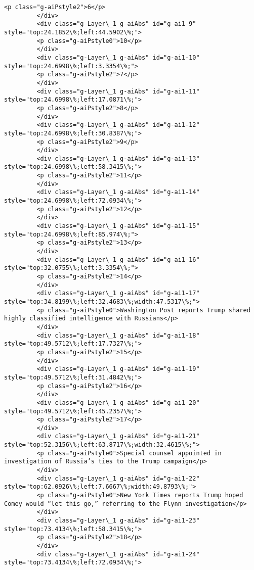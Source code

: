 \documentclass[11pt]{article}
\begin{document}
\begin{Verbatim}[commandchars=\\\{\}]
         <p class="g-aiPstyle2">6</p>
         </div>
         <div class="g-Layer\_1 g-aiAbs" id="g-ai1-9" style="top:24.1852\%;left:44.5902\%;">
         <p class="g-aiPstyle0">10</p>
         </div>
         <div class="g-Layer\_1 g-aiAbs" id="g-ai1-10" style="top:24.6998\%;left:3.3354\%;">
         <p class="g-aiPstyle2">7</p>
         </div>
         <div class="g-Layer\_1 g-aiAbs" id="g-ai1-11" style="top:24.6998\%;left:17.0871\%;">
         <p class="g-aiPstyle2">8</p>
         </div>
         <div class="g-Layer\_1 g-aiAbs" id="g-ai1-12" style="top:24.6998\%;left:30.8387\%;">
         <p class="g-aiPstyle2">9</p>
         </div>
         <div class="g-Layer\_1 g-aiAbs" id="g-ai1-13" style="top:24.6998\%;left:58.3415\%;">
         <p class="g-aiPstyle2">11</p>
         </div>
         <div class="g-Layer\_1 g-aiAbs" id="g-ai1-14" style="top:24.6998\%;left:72.0934\%;">
         <p class="g-aiPstyle2">12</p>
         </div>
         <div class="g-Layer\_1 g-aiAbs" id="g-ai1-15" style="top:24.6998\%;left:85.974\%;">
         <p class="g-aiPstyle2">13</p>
         </div>
         <div class="g-Layer\_1 g-aiAbs" id="g-ai1-16" style="top:32.0755\%;left:3.3354\%;">
         <p class="g-aiPstyle2">14</p>
         </div>
         <div class="g-Layer\_1 g-aiAbs" id="g-ai1-17" style="top:34.8199\%;left:32.4683\%;width:47.5317\%;">
         <p class="g-aiPstyle0">Washington Post reports Trump shared highly classified intelligence with Russians</p>
         </div>
         <div class="g-Layer\_1 g-aiAbs" id="g-ai1-18" style="top:49.5712\%;left:17.7327\%;">
         <p class="g-aiPstyle2">15</p>
         </div>
         <div class="g-Layer\_1 g-aiAbs" id="g-ai1-19" style="top:49.5712\%;left:31.4842\%;">
         <p class="g-aiPstyle2">16</p>
         </div>
         <div class="g-Layer\_1 g-aiAbs" id="g-ai1-20" style="top:49.5712\%;left:45.2357\%;">
         <p class="g-aiPstyle2">17</p>
         </div>
         <div class="g-Layer\_1 g-aiAbs" id="g-ai1-21" style="top:52.3156\%;left:63.8717\%;width:32.4615\%;">
         <p class="g-aiPstyle0">Special counsel appointed in investigation of Russia’s ties to the Trump campaign</p>
         </div>
         <div class="g-Layer\_1 g-aiAbs" id="g-ai1-22" style="top:62.0926\%;left:7.6667\%;width:49.8793\%;">
         <p class="g-aiPstyle0">New York Times reports Trump hoped Comey would “let this go,” referring to the Flynn investigation</p>
         </div>
         <div class="g-Layer\_1 g-aiAbs" id="g-ai1-23" style="top:73.4134\%;left:58.3415\%;">
         <p class="g-aiPstyle2">18</p>
         </div>
         <div class="g-Layer\_1 g-aiAbs" id="g-ai1-24" style="top:73.4134\%;left:72.0934\%;">

\end{Verbatim}
\end{document}
